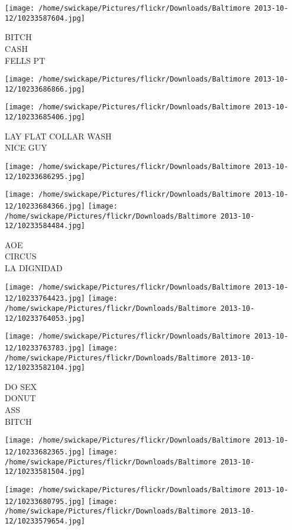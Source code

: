 \documentclass[10pt,letterpaper]{article}
\begin{document}
\vspace{0.25in}
\texttt{[image: /home/swickape/Pictures/flickr/Downloads/Baltimore 2013-10-12/10233587604.jpg]}

BITCH\\
CASH\\
FELLS PT
\pagebreak

\texttt{[image: /home/swickape/Pictures/flickr/Downloads/Baltimore 2013-10-12/10233686866.jpg]}

\vspace{0.25in}
\texttt{[image: /home/swickape/Pictures/flickr/Downloads/Baltimore 2013-10-12/10233685406.jpg]}

LAY FLAT COLLAR WASH\\
NICE GUY
\pagebreak

\texttt{[image: /home/swickape/Pictures/flickr/Downloads/Baltimore 2013-10-12/10233686295.jpg]}

\vspace{0.25in}
\texttt{[image: /home/swickape/Pictures/flickr/Downloads/Baltimore 2013-10-12/10233684366.jpg]}
\texttt{[image: /home/swickape/Pictures/flickr/Downloads/Baltimore 2013-10-12/10233584484.jpg]}

AOE\\
CIRCUS\\
LA DIGNIDAD
\pagebreak

\texttt{[image: /home/swickape/Pictures/flickr/Downloads/Baltimore 2013-10-12/10233764423.jpg]}
\texttt{[image: /home/swickape/Pictures/flickr/Downloads/Baltimore 2013-10-12/10233764053.jpg]}

\texttt{[image: /home/swickape/Pictures/flickr/Downloads/Baltimore 2013-10-12/10233763783.jpg]}
\texttt{[image: /home/swickape/Pictures/flickr/Downloads/Baltimore 2013-10-12/10233582104.jpg]}

DO SEX\\
DONUT\\
ASS\\
BITCH
\pagebreak

\texttt{[image: /home/swickape/Pictures/flickr/Downloads/Baltimore 2013-10-12/10233682365.jpg]}
\texttt{[image: /home/swickape/Pictures/flickr/Downloads/Baltimore 2013-10-12/10233581504.jpg]}

\texttt{[image: /home/swickape/Pictures/flickr/Downloads/Baltimore 2013-10-12/10233680795.jpg]}
\texttt{[image: /home/swickape/Pictures/flickr/Downloads/Baltimore 2013-10-12/10233579654.jpg]}
\end{document}
